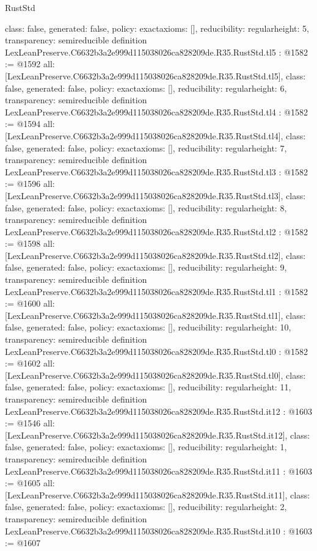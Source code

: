 \begin{lexlean}{RustStd}
\begin{coremodule}
{  class: false,
  generated: false,
  policy: exact{axioms: []},
  reducibility: regular{height: 5},
  transparency: semireducible
}
definition LexLeanPreserve.C6632b3a2e999d115038026ca828209de.R35.RustStd.tl5 : @1582 := @1592 {
  all: [LexLeanPreserve.C6632b3a2e999d115038026ca828209de.R35.RustStd.tl5],
  class: false,
  generated: false,
  policy: exact{axioms: []},
  reducibility: regular{height: 6},
  transparency: semireducible
}
definition LexLeanPreserve.C6632b3a2e999d115038026ca828209de.R35.RustStd.tl4 : @1582 := @1594 {
  all: [LexLeanPreserve.C6632b3a2e999d115038026ca828209de.R35.RustStd.tl4],
  class: false,
  generated: false,
  policy: exact{axioms: []},
  reducibility: regular{height: 7},
  transparency: semireducible
}
definition LexLeanPreserve.C6632b3a2e999d115038026ca828209de.R35.RustStd.tl3 : @1582 := @1596 {
  all: [LexLeanPreserve.C6632b3a2e999d115038026ca828209de.R35.RustStd.tl3],
  class: false,
  generated: false,
  policy: exact{axioms: []},
  reducibility: regular{height: 8},
  transparency: semireducible
}
definition LexLeanPreserve.C6632b3a2e999d115038026ca828209de.R35.RustStd.tl2 : @1582 := @1598 {
  all: [LexLeanPreserve.C6632b3a2e999d115038026ca828209de.R35.RustStd.tl2],
  class: false,
  generated: false,
  policy: exact{axioms: []},
  reducibility: regular{height: 9},
  transparency: semireducible
}
definition LexLeanPreserve.C6632b3a2e999d115038026ca828209de.R35.RustStd.tl1 : @1582 := @1600 {
  all: [LexLeanPreserve.C6632b3a2e999d115038026ca828209de.R35.RustStd.tl1],
  class: false,
  generated: false,
  policy: exact{axioms: []},
  reducibility: regular{height: 10},
  transparency: semireducible
}
definition LexLeanPreserve.C6632b3a2e999d115038026ca828209de.R35.RustStd.tl0 : @1582 := @1602 {
  all: [LexLeanPreserve.C6632b3a2e999d115038026ca828209de.R35.RustStd.tl0],
  class: false,
  generated: false,
  policy: exact{axioms: []},
  reducibility: regular{height: 11},
  transparency: semireducible
}
definition LexLeanPreserve.C6632b3a2e999d115038026ca828209de.R35.RustStd.it12 : @1603 := @1546 {
  all: [LexLeanPreserve.C6632b3a2e999d115038026ca828209de.R35.RustStd.it12],
  class: false,
  generated: false,
  policy: exact{axioms: []},
  reducibility: regular{height: 1},
  transparency: semireducible
}
definition LexLeanPreserve.C6632b3a2e999d115038026ca828209de.R35.RustStd.it11 : @1603 := @1605 {
  all: [LexLeanPreserve.C6632b3a2e999d115038026ca828209de.R35.RustStd.it11],
  class: false,
  generated: false,
  policy: exact{axioms: []},
  reducibility: regular{height: 2},
  transparency: semireducible
}
definition LexLeanPreserve.C6632b3a2e999d115038026ca828209de.R35.RustStd.it10 : @1603 := @1607 {
}
\end{coremodule}
\end{lexlean}
